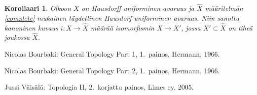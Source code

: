 \documentclass[12pt,a4paper,leqno]{report}
\theoremstyle{plain}
\newtheorem{lause}[equation]{Lause}
\newtheorem{lem}[equation]{Lemma}
\newtheorem{kor}[equation]{Korollaari}
\theoremstyle{definition}
\newtheorem{maar}[equation]{Määritelmä}
\newtheorem{esim}[equation]{Esimerkki}
\theoremstyle{remark}
\newtheorem{huom}[equation]{Huomautus}
\begin{document}
\begin{kor}
Olkoon $X$ on Hausdorff uniforminen avaruus ja $\hat X$ määritelmän \ref{complete} mukainen täydellinen Hausdorf uniforminen avaruus. 
Niin sanottu kanoninen kuvaus $i\colon X\rightarrow\hat X$ määrää 
isomorfismin $X\rightarrow X'$, jossa $X'\subset \hat X$ on tiheä joukossa $\hat X$.
\end{kor}


\begin{thebibliography}{9}

Nicolas Bourbaki: General Topology Part 1, 1.\ painos, Hermann, 1966.

Nicolas Bourbaki: General Topology Part 2, 1.\ painos, Hermann, 1966.

%
%
Jussi Väisälä: Topologia II, 2.\ korjattu painos, Limes ry, 2005.



\end{thebibliography}
\end{document}
